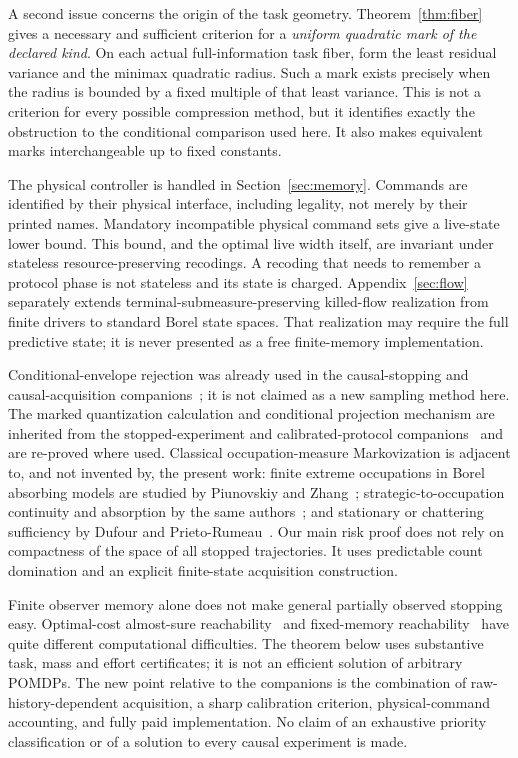 A second issue concerns the origin of the task geometry. Theorem~\ref{thm:fiber} gives a necessary and sufficient criterion for a \emph{uniform quadratic mark of the declared kind}. On each actual full-information task fiber, form the least residual variance and the minimax quadratic radius. Such a mark exists precisely when the radius is bounded by a fixed multiple of that least variance. This is not a criterion for every possible compression method, but it identifies exactly the obstruction to the conditional comparison used here. It also makes equivalent marks interchangeable up to fixed constants.

The physical controller is handled in Section~\ref{sec:memory}. Commands are identified by their physical interface, including legality, not merely by their printed names. Mandatory incompatible physical command sets give a live-state lower bound. This bound, and the optimal live width itself, are invariant under stateless resource-preserving recodings. A recoding that needs to remember a protocol phase is not stateless and its state is charged. Appendix~\ref{sec:flow} separately extends terminal-submeasure-preserving killed-flow realization from finite drivers to standard Borel state spaces. That realization may require the full predictive state; it is never presented as a free finite-memory implementation.

Conditional-envelope rejection was already used in the causal-stopping and causal-acquisition companions~\cite{GTF46,GTF51}; it is not claimed as a new sampling method here. The marked quantization calculation and conditional projection mechanism are inherited from the stopped-experiment and calibrated-protocol companions~\cite{GTF52,GTF53} and are re-proved where used. Classical occupation-measure Markovization is adjacent to, and not invented by, the present work: finite extreme occupations in Borel absorbing models are studied by Piunovskiy and Zhang~\cite{PZExtreme}; strategic-to-occupation continuity and absorption by the same authors~\cite{PZContinuity}; and stationary or chattering sufficiency by Dufour and Prieto-Rumeau~\cite{DPAbsorb,DPChatter}. Our main risk proof does not rely on compactness of the space of all stopped trajectories. It uses predictable count domination and an explicit finite-state acquisition construction.

Finite observer memory alone does not make general partially observed stopping easy. Optimal-cost almost-sure reachability~\cite{CCGK} and fixed-memory reachability~\cite{ACSS} have quite different computational difficulties. The theorem below uses substantive task, mass and effort certificates; it is not an efficient solution of arbitrary POMDPs. The new point relative to the companions is the combination of raw-history-dependent acquisition, a sharp calibration criterion, physical-command accounting, and fully paid implementation. No claim of an exhaustive priority classification or of a solution to every causal experiment is made.
